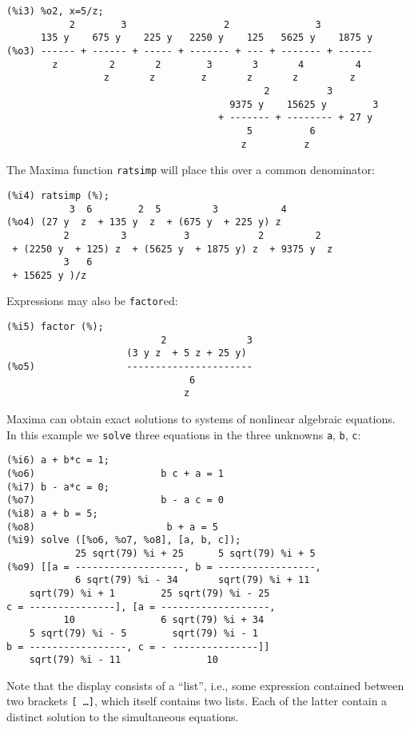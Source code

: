 \documentclass[a4paper,12pt]{article}
\begin{document}
\noindent\begin{minipage}{\textwidth}
\begin{verbatim}
(%i3) %o2, x=5/z;
           2        3                 2               3
      135 y    675 y    225 y   2250 y    125   5625 y    1875 y
(%o3) ------ + ------ + ----- + ------- + --- + ------- + ------
        z         2       2        3       3       4         4
                 z       z        z       z       z         z
                                             2          3
                                       9375 y    15625 y        3
                                     + ------- + -------- + 27 y
                                          5          6
                                         z          z
\end{verbatim}
\end{minipage}
The Maxima function {\tt ratsimp} will place this over a common denominator:
\begin{verbatim}
(%i4) ratsimp (%);
           3  6        2  5         3           4
(%o4) (27 y  z  + 135 y  z  + (675 y  + 225 y) z
          2         3          3            2         2
 + (2250 y  + 125) z  + (5625 y  + 1875 y) z  + 9375 y  z
          3   6
 + 15625 y )/z
\end{verbatim}
Expressions may also be {\tt factor}ed:
\begin{verbatim}
(%i5) factor (%);
                           2              3
                     (3 y z  + 5 z + 25 y)
(%o5)                ----------------------
                                6
                               z
\end{verbatim}
Maxima can obtain exact solutions to systems of nonlinear algebraic
equations.  In this example we {\tt solve} three equations in the
three unknowns {\tt a}, {\tt b}, {\tt c}:
\begin{verbatim}
(%i6) a + b*c = 1;
(%o6)                      b c + a = 1
(%i7) b - a*c = 0;
(%o7)                      b - a c = 0
(%i8) a + b = 5;
(%o8)                       b + a = 5
(%i9) solve ([%o6, %o7, %o8], [a, b, c]);
            25 sqrt(79) %i + 25      5 sqrt(79) %i + 5
(%o9) [[a = -------------------, b = -----------------, 
            6 sqrt(79) %i - 34       sqrt(79) %i + 11
    sqrt(79) %i + 1        25 sqrt(79) %i - 25
c = ---------------], [a = -------------------, 
          10               6 sqrt(79) %i + 34
    5 sqrt(79) %i - 5        sqrt(79) %i - 1
b = -----------------, c = - ---------------]]
    sqrt(79) %i - 11               10
\end{verbatim}
Note that the display consists of a ``list'', i.e., some expression
contained between two brackets {\tt [ \ldots ]}, which itself contains
two lists.  Each of the latter contain a distinct solution to the
simultaneous equations.
\end{document}
